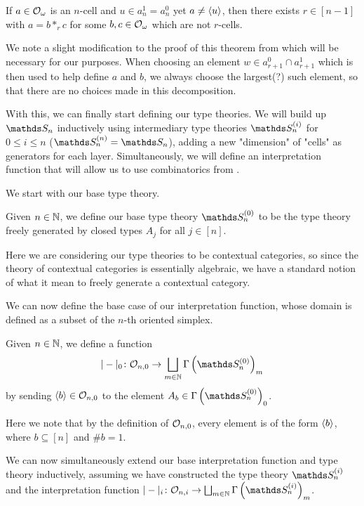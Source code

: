 \documentclass{article}
\begin{document}
\begin{thm}\label{thm:decomp}
    If $a\in\mathcal{O}_\omega$ is an $n$-cell and $u\in a_n^1=a_n^0$ yet $a\neq\langle u\rangle$, then there exists $r\in[n-1]$ with $a=b*_r c$ for some $b,c\in\mathcal{O}_\omega$ which are not $r$-cells.
\end{thm}

We note a slight modification to the proof of this theorem from \cite{Street} which will be necessary for our purposes. When choosing an element $w\in a_{r+1}^0\cap a_{r+1}^1$ which is then used to help define $a$ and $b$, we always choose the largest(?) such element, so that there are no choices made in this decomposition.

With this, we can finally start defining our type theories. We will build up $\bS_n$ inductively using intermediary type theories $\bS_n^{(i)}$ for $0\leq i\leq n$ ($\bS_n^{(n)}=\bS_n$), adding a new "dimension" of "cells" as generators for each layer. Simultaneously, we will define an interpretation function that will allow us to use combinatorics from \cite{Street}.

We start with our base type theory.

\begin{defn}
    Given $n\in\mathbb{N}$, we define our base type theory $\bS_n^{(0)}$ to be the type theory freely generated by closed types $A_j$ for all $j\in[n]$.
\end{defn}

Here we are considering our type theories to be contextual categories, so since the theory of contextual categories is essentially algebraic, we have a standard notion of what it mean to freely generate a contextual category.

We can now define the base case of our interpretation function, whose domain is defined as a subset of the $n$-th oriented simplex.

\begin{defn}
    Given $n\in\mathbb{N}$, we define a function
    $$ |-|_0\colon\mathcal{O}_{n,0}\to\bigsqcup_{m\in\N}\Gamma\left(\bS_n^{(0)}\right)_m $$
    by sending $\langle b\rangle\in\mathcal{O}_{n,0}$ to the element $A_{b}\in\Gamma\left(\bS_n^{(0)}\right)_0$.
\end{defn}

Here we note that by the definition of $\mathcal{O}_{n,0}$, every element is of the form $\langle b\rangle$, where $b\subseteq[n]$ and $\#b=1$.

We can now simultaneously extend our base interpretation function and type theory inductively, assuming we have constructed the type theory $\bS_n^{(i)}$ and the interpretation function $|-|_i\colon\mathcal{O}_{n,i}\to\bigsqcup_{m\in\N}\Gamma\left(\bS_n^{(i)}\right)_m$.
\end{document}
